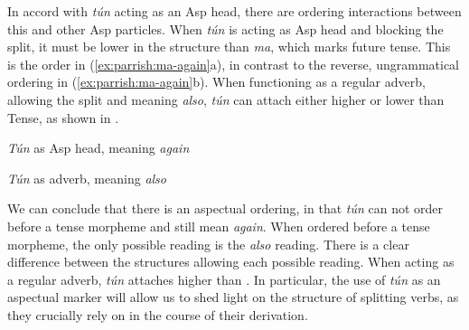 \documentclass[output=paper,newtxmath,modfonts,nonflat,draftmode]{langsci/langscibook}
\begin{document}
 
In accord with \textit{tún} acting as an Asp head, there are ordering interactions between this and other Asp particles. When \textit{tún} is acting as Asp head and blocking the split, it must be lower in the structure than \textit{ma}, which marks future tense. This is the order in (\ref{ex:parrish:ma-again}a), in contrast to the reverse, ungrammatical ordering in (\ref{ex:parrish:ma-again}b). When functioning as a regular adverb, allowing the split and meaning \textit{also}, \textit{tún} can attach either higher or lower than Tense, as shown in . 
   

\ea  \label{ex:parrish:ma-again}  \textit{Tún} as Asp head, meaning \textit{again}
    
 \z

\z



\ea \textit{Tún} as adverb, meaning \textit{also}
    
 \z
 \label{ex:parrish:ma-also} 
\z


We can conclude that there is an aspectual ordering, in that \textit{tún} can not order before a tense morpheme and still mean \textit{again}. When ordered before a tense morpheme, the only possible reading is the \textit{also} reading. There is a clear difference between the structures allowing each possible reading. When acting as a regular adverb, \textit{tún} attaches higher than . In particular, the use of \textit{tún} as an aspectual marker will allow us to shed light on the structure of splitting verbs, as they crucially rely on  in the course of their derivation.
\end{document}
